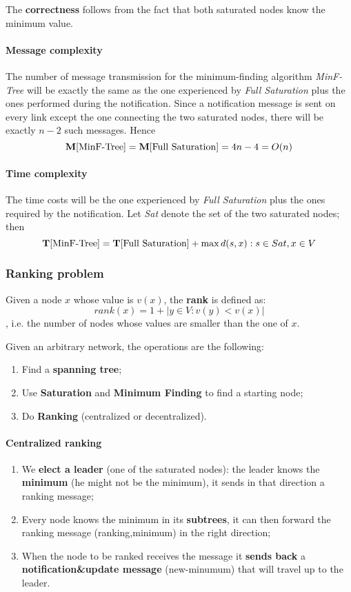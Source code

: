 The \textbf{correctness} follows from the fact that both saturated nodes know the minimum value.

\paragraph{Message complexity}
The number of message transmission for the minimum-finding algorithm \textit{MinF-Tree} will be exactly the same as the one experienced by \textit{Full Saturation} plus the ones performed during the notification. Since a notification message is sent on every link except the one connecting the two saturated nodes, there will be exactly $n - 2$ such messages. Hence
$$\mathbf{M}[\text{MinF-Tree}] = \mathbf{M}[\text{Full Saturation}] = 4n-4 = O(n)$$

\paragraph{Time complexity}
The time costs will be the one experienced by \textit{Full Saturation} plus the ones required by the notification. Let \textit{Sat} denote the set of the two saturated nodes; then
$$\mathbf{T}[\text{MinF-Tree}] = \mathbf{T}[\text{Full Saturation}] + \max{d(s, x): s \in Sat, x \in V}$$

\subsubsection{Ranking problem}
Given a node $x$ whose value is $v(x)$, the \textbf{rank} is defined as:
$$
rank(x) = 1 + |y \in V: v(y) < v(x)|
$$
, i.e. the number of nodes whose values are smaller than the one of $x$.


Given an arbitrary network, the operations are the following:
\begin{enumerate}
    \item Find a \textbf{spanning tree};
    \item Use \textbf{Saturation} and \textbf{Minimum Finding} to find a starting node;
    \item Do \textbf{Ranking} (centralized or decentralized).
\end{enumerate}

\paragraph{Centralized ranking}
\begin{enumerate}
    \item We \textbf{elect a leader} (one of the saturated nodes): the leader knows the \textbf{minimum} (he might not be the minimum), it sends in that direction a ranking message;
    \item Every node knows the minimum in its \textbf{subtrees}, it can then forward the ranking message (ranking,minimum) in the right direction;
    \item When the node to be ranked receives the message it \textbf{sends back} a \textbf{notification\&update message} (new-minumum) that will travel up to the leader.
\end{enumerate}

